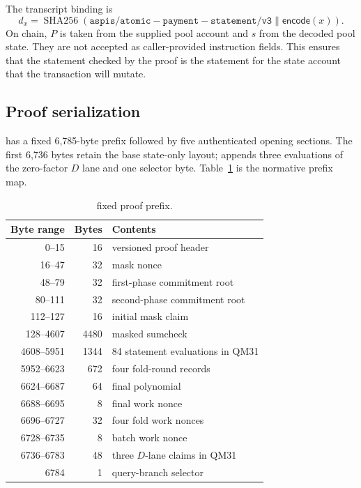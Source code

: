 The transcript binding is
\[
  d_x=\operatorname{SHA256}(
  \mathtt{aspis/atomic-payment-statement/v3}\mathbin\|\mathsf{encode}(x)).
\]
On chain, \(P\) is taken from the supplied pool account and \(s\) from the
decoded pool state.  They are not accepted as caller-provided instruction
fields.  This ensures that the statement checked by the proof is the statement
for the state account that the transaction will mutate.

\subsection{Proof serialization}
\label{sec:implementation-proof-wire}

\Profile{} has a fixed 6,785-byte prefix followed by five authenticated opening
sections.  The first 6,736 bytes retain the base state-only layout; \Profile{}
appends three evaluations of the zero-factor \(D\) lane and one selector byte.
Table~\ref{tab:proof-prefix} is the normative prefix map.

\begin{table}[t]
  \centering
  \small
  \caption{\Profile{} fixed proof prefix.}
  \label{tab:proof-prefix}
  \begin{tabular}{r r l}
    \toprule
    Byte range & Bytes & Contents \\
    \midrule
    0--15       & 16   & versioned proof header \\
    16--47      & 32   & mask nonce \\
    48--79      & 32   & first-phase commitment root \\
    80--111     & 32   & second-phase commitment root \\
    112--127    & 16   & initial mask claim \\
    128--4607   & 4480 & masked sumcheck \\
    4608--5951  & 1344 & 84 statement evaluations in QM31 \\
    5952--6623  & 672  & four fold-round records \\
    6624--6687  & 64   & final polynomial \\
    6688--6695  & 8    & final work nonce \\
    6696--6727  & 32   & four fold work nonces \\
    6728--6735  & 8    & batch work nonce \\
    6736--6783  & 48   & three \(D\)-lane claims in QM31 \\
    6784         & 1    & query-branch selector \\
    \bottomrule
  \end{tabular}
\end{table}

